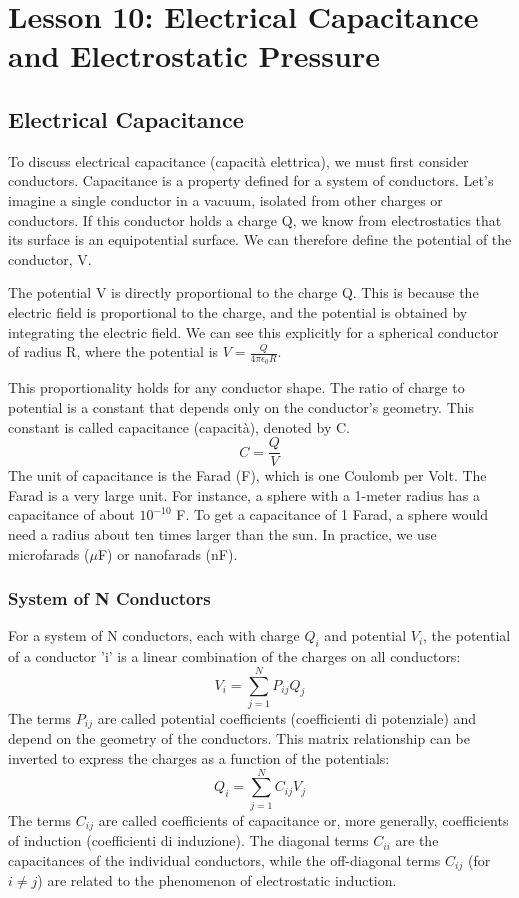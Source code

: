 \section{Lesson 10: Electrical Capacitance and Electrostatic Pressure}

\subsection{Electrical Capacitance}

To discuss electrical capacitance (capacità elettrica), we must first consider conductors. Capacitance is a property defined for a system of conductors. Let's imagine a single conductor in a vacuum, isolated from other charges or conductors. If this conductor holds a charge Q, we know from electrostatics that its surface is an equipotential surface. We can therefore define the potential of the conductor, V.

The potential V is directly proportional to the charge Q. This is because the electric field is proportional to the charge, and the potential is obtained by integrating the electric field. We can see this explicitly for a spherical conductor of radius R, where the potential is $V = \frac{Q}{4\pi\epsilon_0 R}$.

This proportionality holds for any conductor shape. The ratio of charge to potential is a constant that depends only on the conductor's geometry. This constant is called capacitance (capacità), denoted by C.
\begin{equation*}
C = \frac{Q}{V}
\end{equation*}
The unit of capacitance is the Farad (F), which is one Coulomb per Volt. The Farad is a very large unit. For instance, a sphere with a 1-meter radius has a capacitance of about $10^{-10}$ F. To get a capacitance of 1 Farad, a sphere would need a radius about ten times larger than the sun. In practice, we use microfarads ($\mu$F) or nanofarads (nF).

\subsubsection{System of N Conductors}

For a system of N conductors, each with charge $Q_i$ and potential $V_i$, the potential of a conductor 'i' is a linear combination of the charges on all conductors:
\begin{equation*}
V_i = \sum_{j=1}^{N} P_{ij} Q_j
\end{equation*}
The terms $P_{ij}$ are called potential coefficients (coefficienti di potenziale) and depend on the geometry of the conductors. This matrix relationship can be inverted to express the charges as a function of the potentials:
\begin{equation*}
Q_i = \sum_{j=1}^{N} C_{ij} V_j
\end{equation*}
The terms $C_{ij}$ are called coefficients of capacitance or, more generally, coefficients of induction (coefficienti di induzione). The diagonal terms $C_{ii}$ are the capacitances of the individual conductors, while the off-diagonal terms $C_{ij}$ (for $i \neq j$) are related to the phenomenon of electrostatic induction.

